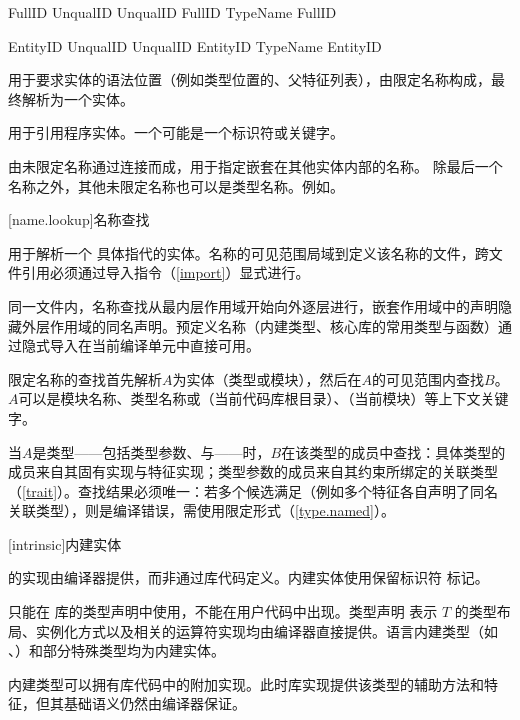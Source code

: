 \begin{bnf}{FullID}
    UnqualID \br
    UnqualID \terminal{::} FullID \br
    TypeName \terminal{::} FullID
\end{bnf}

\begin{bnf}{EntityID}
    UnqualID \br
    UnqualID \terminal{::} EntityID \br
    TypeName \terminal{::} EntityID
\end{bnf}

\pnum
{}用于要求实体的语法位置（例如类型位置的、父特征列表），由限定名称构成，最终解析为一个实体。

\pnum
{}用于引用程序实体。一个可能是一个标识符或关键字。

\pnum
{}由未限定名称通过\tcode{::}连接而成，用于指定嵌套在其他实体内部的名称。
除最后一个名称之外，其他未限定名称也可以是类型名称。\enterexample 例如。\exitexample

[name.lookup]{名称查找}

\pnum
{}用于解析一个  具体指代的实体。名称的可见范围局域到定义该名称的文件，跨文件引用必须通过导入指令（\ref{import}）显式进行。

\pnum
同一文件内，名称查找从最内层作用域开始向外逐层进行，嵌套作用域中的声明隐藏外层作用域的同名声明。预定义名称（内建类型、核心库的常用类型与函数）通过隐式导入在当前编译单元中直接可用。

\pnum
限定名称的查找首先解析$A$为实体（类型或模块），然后在$A$的可见范围内查找$B$。$A$可以是模块名称、类型名称或（当前代码库根目录）、（当前模块）等上下文关键字。

\pnum
当$A$是类型——包括类型参数、与——时，$B$在该类型的成员中查找：具体类型的成员来自其固有实现与特征实现；类型参数的成员来自其约束所绑定的关联类型（\ref{trait}）。查找结果必须唯一：若多个候选满足（例如多个特征各自声明了同名关联类型），则是编译错误，需使用限定形式（\ref{type.named}）。

[intrinsic]{内建实体}

\pnum
{}的实现由编译器提供，而非通过库代码定义。内建实体使用保留标识符  标记。

\pnum
{} 只能在  库的类型声明中使用，不能在用户代码中出现。类型声明  表示 $T$ 的类型布局、实例化方式以及相关的运算符实现均由编译器直接提供。语言内建类型（如 、）和部分特殊类型均为内建实体。

\pnum
内建类型可以拥有库代码中的附加实现。此时库实现提供该类型的辅助方法和特征，但其基础语义仍然由编译器保证。
